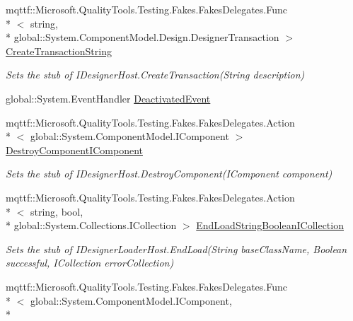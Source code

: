 \begin{DoxyCompactItemize}
mqttf\-::\-Microsoft.\-Quality\-Tools.\-Testing.\-Fakes.\-Fakes\-Delegates.\-Func\\*
$<$ string, \\*
global\-::\-System.\-Component\-Model.\-Design.\-Designer\-Transaction $>$ \hyperlink{class_system_1_1_component_model_1_1_design_1_1_serialization_1_1_fakes_1_1_stub_i_designer_loader_host2_ae9682502a5bc02d890a8f9399ff0ffee}{Create\-Transaction\-String}
\begin{DoxyCompactList}\small\item\em Sets the stub of I\-Designer\-Host.\-Create\-Transaction(\-String description)\end{DoxyCompactList}\item 
global\-::\-System.\-Event\-Handler \hyperlink{class_system_1_1_component_model_1_1_design_1_1_serialization_1_1_fakes_1_1_stub_i_designer_loader_host2_a92ba799879576ec29d81733374486055}{Deactivated\-Event}
\item 
mqttf\-::\-Microsoft.\-Quality\-Tools.\-Testing.\-Fakes.\-Fakes\-Delegates.\-Action\\*
$<$ global\-::\-System.\-Component\-Model.\-I\-Component $>$ \hyperlink{class_system_1_1_component_model_1_1_design_1_1_serialization_1_1_fakes_1_1_stub_i_designer_loader_host2_a3fabc510f73f2e157dd55d2c61837608}{Destroy\-Component\-I\-Component}
\begin{DoxyCompactList}\small\item\em Sets the stub of I\-Designer\-Host.\-Destroy\-Component(\-I\-Component component)\end{DoxyCompactList}\item 
mqttf\-::\-Microsoft.\-Quality\-Tools.\-Testing.\-Fakes.\-Fakes\-Delegates.\-Action\\*
$<$ string, bool, \\*
global\-::\-System.\-Collections.\-I\-Collection $>$ \hyperlink{class_system_1_1_component_model_1_1_design_1_1_serialization_1_1_fakes_1_1_stub_i_designer_loader_host2_a25409db7cc6853e17c60edfa74476129}{End\-Load\-String\-Boolean\-I\-Collection}
\begin{DoxyCompactList}\small\item\em Sets the stub of I\-Designer\-Loader\-Host.\-End\-Load(\-String base\-Class\-Name, Boolean successful, I\-Collection error\-Collection)\end{DoxyCompactList}\item 
mqttf\-::\-Microsoft.\-Quality\-Tools.\-Testing.\-Fakes.\-Fakes\-Delegates.\-Func\\*
$<$ global\-::\-System.\-Component\-Model.\-I\-Component, \\*

\end{DoxyCompactItemize}
